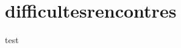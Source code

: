 \hypertarget{difficultesrencontres}{%
\chapter{difficultesrencontres}\label{difficultesrencontres}}

test
